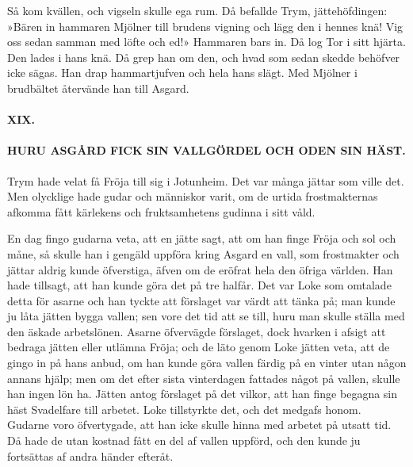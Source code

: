 Så kom kvällen, och vigseln skulle ega rum. Då befallde Trym,
jättehöfdingen: »Bären in hammaren Mjölner till brudens vigning och lägg
den i hennes knä! Vig oss sedan samman med löfte och ed!» Hammaren bars
in. Då
\protect\hypertarget{lb1625905.xhtmlux5cux23start59}{}{}\protect\hypertarget{lb1625905.xhtmlux5cux23start59-a}{}{}\protect\hypertarget{lb1625905.xhtmlux5cux23start59-b}{}{}\protect\hypertarget{lb1625905.xhtmlux5cux23start59-c}{}{}\protect\hypertarget{lb1625905.xhtmlux5cux23start59-d}{}{}
log Tor i sitt hjärta. Den lades i hans knä. Då grep han om den, och
hvad som sedan skedde behöfver icke sägas. Han drap hammartjufven och
hela hans slägt. Med Mjölner i brudbältet återvände han till Asgard.

\paragraph{XIX.}

\paragraph{HURU ASGÅRD FICK SIN VALLGÖRDEL OCH ODEN SIN HÄST.}

Trym hade velat få Fröja till sig i Jotunheim. Det var många jättar som
ville det. Men olycklige hade gudar och människor varit, om de urtida
frostmakternas afkomma fått kärlekens och fruktsamhetens gudinna i sitt
våld.

En dag fingo gudarna veta, att en jätte sagt, att om han finge Fröja och
sol och måne, så skulle han i gengäld uppföra kring Asgard en vall, som
frostmakter och jättar aldrig kunde öfverstiga, äfven om de eröfrat hela
den öfriga världen. Han hade tillsagt, att han kunde göra det på tre
halfår. Det var Loke som omtalade detta för asarne och han tyckte att
förslaget var värdt att tänka på; man kunde ju låta jätten bygga vallen;
sen vore det tid att se till, huru man skulle ställa med den äskade
arbetslönen. Asarne öfvervägde förslaget, dock hvarken i afsigt att
bedraga jätten eller utlämna Fröja; och de läto genom Loke jätten veta,
att de gingo in på hans anbud, om han kunde göra vallen färdig på en
vinter utan någon annans hjälp; men om det efter sista vinterdagen
fattades något på vallen, skulle han ingen lön ha. Jätten antog
förslaget på det vilkor, att han finge begagna sin häst Svadelfare till
arbetet. Loke tillstyrkte det, och det medgafs honom. Gudarne voro
öfvertygade, att han icke skulle hinna med arbetet på utsatt tid. Då
hade de utan kostnad fått en del af vallen uppförd, och den kunde ju
fortsättas af andra händer efteråt.

